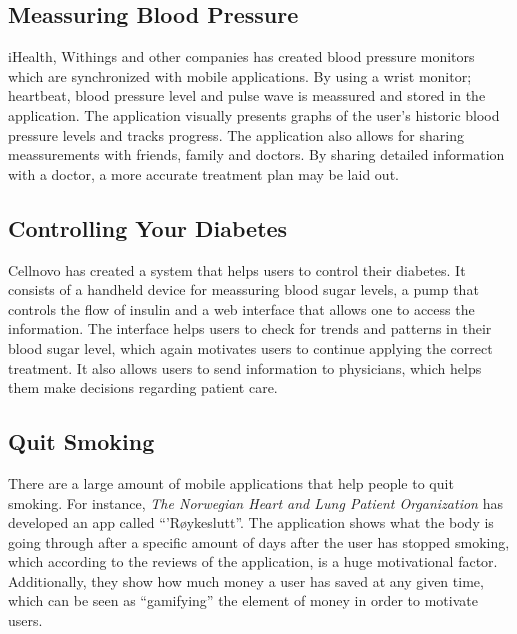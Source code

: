 \subsection{Meassuring Blood Pressure}
\label{sec:bloodpressure}
iHealth, Withings and other companies has created blood pressure monitors which are synchronized with mobile applications. By using a wrist monitor; heartbeat, blood pressure level and pulse wave is meassured and stored in the application. The application visually presents graphs of the user's historic blood pressure levels and tracks progress. The application also allows for sharing meassurements with friends, family and doctors. By sharing detailed information with a doctor, a more accurate treatment plan may be laid out.


\subsection{Controlling Your Diabetes}
\label{sec:controldiabetes}
Cellnovo has created a system that helps users to control their diabetes. It consists of a handheld device for meassuring blood sugar levels, a pump that controls the flow of insulin and a web interface that allows one to access the information. The interface helps users to check for trends and patterns in their blood sugar level, which again motivates users to continue applying the correct treatment. It also allows users to send information to physicians, which helps them make decisions regarding patient care.
      

\subsection{Quit Smoking}
\label{sec:quitsmoking}
There are a large amount of mobile applications that help people to quit smoking. For instance, \emph{The Norwegian Heart and Lung Patient Organization} has developed an app called ``'R\o ykeslutt''. The application shows what the body is going through after a specific amount of days after the user has stopped smoking, which according to the reviews of the application, is a huge motivational factor. Additionally, they show how much money a user has saved at any given time, which can be seen as ``gamifying'' the element of money in order to motivate users.  


